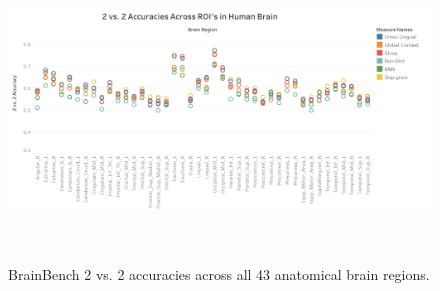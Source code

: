 \label{chapter:appendix}

\begin{figure}[h]
\centering
\includegraphics[width=16cm, height=8cm]{Figures/ROI_score}
\caption{BrainBench 2 vs. 2 accuracies across all 43 anatomical brain regions.}
\label{all43}
\end{figure}
\newpage


